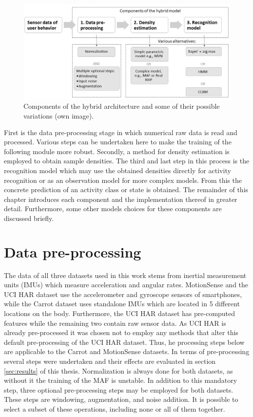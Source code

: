 \documentclass[11pt,titlepage,oneside,openany]{book}
\begin{document}
\begin{figure}[h]
	\centering
	\includegraphics[width=\linewidth]{Hybrid_V2.jpg}
	\caption[Hybrid architecture components]{Components of the hybrid architecture and some of their possible variations (own image).}
	\label{fig:schema}
\end{figure}

\noindent First is the data pre-processing stage in which numerical raw data is read and processed. Various steps can be undertaken here to make the training of the following module more robust. Secondly, a method for density estimation is employed to obtain sample densities. The third and last step in this process is the recognition model which may use the obtained densities directly for activity recognition or as an observation model for more complex models. From this the concrete prediction of an activity class or state is obtained. The remainder of this chapter introduces each component and the implementation thereof in greater detail. Furthermore, some other models choices for these components are discussed briefly.

\section{Data pre-processing}
\label{sec:prep}

The data of all three datasets used in this work stems from inertial measurement units (IMUs) which measure acceleration and angular rates. MotionSense \cite{malekzadeh_mobile_2019} and the UCI HAR \cite{anguita_public_2013} dataset use the accelerometer and gyroscope sensors of smartphones, while the Carrot dataset \cite{kruger_recognising_2011} uses standalone IMUs which are located in 5 different locations on the body. Furthermore, the UCI HAR dataset has pre-computed features while the remaining two contain raw sensor data. As UCI HAR is already pre-processed it was chosen not to employ any methods that alter this default pre-processing of the UCI HAR dataset. Thus, he processing steps below are applicable to the Carrot and MotionSense datasets. In terms of pre-processing several steps were undertaken and their effects are evaluated in section \ref{sec:results} of this thesis. Normalization is always done for both datasets, as without it the training of the MAF is unstable. In addition to this mandatory step, three optional pre-processing steps may be employed for both datasets. These steps are windowing, augmentation, and noise addition. It is possible to select a subset of these operations, including none or all of them together.
\end{document}
